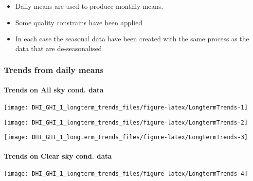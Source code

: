 \documentclass[
  10pt,
  a4paper,oneside]{article}
\providecommand{\tightlist}{%
  \setlength{\itemsep}{0pt}\setlength{\parskip}{0pt}}
\begin{document}
\begin{itemize}
\tightlist
\item
  Daily means are used to produce monthly means.
\item
  Some quality constrains have been applied
\item
  In each case the seasonal data have been created with the same process as
  the data that are de-seasonalised.
\end{itemize}

\newpage
\FloatBarrier

\hypertarget{trends-from-daily-means}{%
\subsubsection{Trends from daily means}\label{trends-from-daily-means}}

\newpage

\hypertarget{trends-on-all-sky-cond.-data}{%
\paragraph{Trends on All sky cond. data}\label{trends-on-all-sky-cond.-data}}

\begin{center}\texttt{[image: DHI\_GHI\_1\_longterm\_trends\_files/figure-latex/LongtermTrends-1]} \end{center}

\begin{center}\texttt{[image: DHI\_GHI\_1\_longterm\_trends\_files/figure-latex/LongtermTrends-2]} \end{center}

\begin{center}\texttt{[image: DHI\_GHI\_1\_longterm\_trends\_files/figure-latex/LongtermTrends-3]} \end{center}

\newpage

\hypertarget{trends-on-clear-sky-cond.-data}{%
\paragraph{Trends on Clear sky cond. data}\label{trends-on-clear-sky-cond.-data}}

\begin{center}\texttt{[image: DHI\_GHI\_1\_longterm\_trends\_files/figure-latex/LongtermTrends-4]} \end{center}
\end{document}
